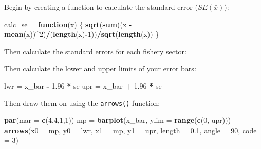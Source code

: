 \documentclass[]{book}
\newenvironment{Shaded}{\begin{snugshade}}{\end{snugshade}}
\newcommand{\KeywordTok}[1]{\textcolor[rgb]{0.13,0.29,0.53}{\textbf{#1}}}
\newcommand{\DataTypeTok}[1]{\textcolor[rgb]{0.13,0.29,0.53}{#1}}
\newcommand{\DecValTok}[1]{\textcolor[rgb]{0.00,0.00,0.81}{#1}}
\newcommand{\FloatTok}[1]{\textcolor[rgb]{0.00,0.00,0.81}{#1}}
\newcommand{\StringTok}[1]{\textcolor[rgb]{0.31,0.60,0.02}{#1}}
\newcommand{\ControlFlowTok}[1]{\textcolor[rgb]{0.13,0.29,0.53}{\textbf{#1}}}
\newcommand{\OperatorTok}[1]{\textcolor[rgb]{0.81,0.36,0.00}{\textbf{#1}}}
\newcommand{\NormalTok}[1]{#1}
\theoremstyle{definition}
\theoremstyle{definition}
\theoremstyle{definition}
\theoremstyle{remark}
\begin{document}
Begin by creating a function to calculate the standard error
(\(SE(\bar{x})\)):

\begin{Shaded}
\begin{Highlighting}[]
\NormalTok{calc_se =}\StringTok{ }\ControlFlowTok{function}\NormalTok{(x) \{}
  \KeywordTok{sqrt}\NormalTok{(}\KeywordTok{sum}\NormalTok{((x }\OperatorTok{-}\StringTok{ }\KeywordTok{mean}\NormalTok{(x))}\OperatorTok{^}\DecValTok{2}\NormalTok{)}\OperatorTok{/}\NormalTok{(}\KeywordTok{length}\NormalTok{(x)}\OperatorTok{-}\DecValTok{1}\NormalTok{))}\OperatorTok{/}\KeywordTok{sqrt}\NormalTok{(}\KeywordTok{length}\NormalTok{(x))}
\NormalTok{\}}
\end{Highlighting}
\end{Shaded}

Then calculate the standard errors for each fishery sector:

\begin{Shaded}
\end{Shaded}

Then calculate the lower and upper limits of your error bars:

\begin{Shaded}
\begin{Highlighting}[]
\NormalTok{lwr =}\StringTok{ }\NormalTok{x_bar }\OperatorTok{-}\StringTok{ }\FloatTok{1.96} \OperatorTok{*}\StringTok{ }\NormalTok{se}
\NormalTok{upr =}\StringTok{ }\NormalTok{x_bar }\OperatorTok{+}\StringTok{ }\FloatTok{1.96} \OperatorTok{*}\StringTok{ }\NormalTok{se}
\end{Highlighting}
\end{Shaded}

Then draw them on using the \texttt{arrows()} function:

\begin{Shaded}
\begin{Highlighting}[]
\KeywordTok{par}\NormalTok{(}\DataTypeTok{mar =} \KeywordTok{c}\NormalTok{(}\DecValTok{4}\NormalTok{,}\DecValTok{4}\NormalTok{,}\DecValTok{1}\NormalTok{,}\DecValTok{1}\NormalTok{))}
\NormalTok{mp =}\StringTok{ }\KeywordTok{barplot}\NormalTok{(x_bar, }\DataTypeTok{ylim =} \KeywordTok{range}\NormalTok{(}\KeywordTok{c}\NormalTok{(}\DecValTok{0}\NormalTok{, upr)))}
\KeywordTok{arrows}\NormalTok{(}\DataTypeTok{x0 =}\NormalTok{ mp, }\DataTypeTok{y0 =}\NormalTok{ lwr, }\DataTypeTok{x1 =}\NormalTok{ mp, }\DataTypeTok{y1 =}\NormalTok{ upr, }\DataTypeTok{length =} \FloatTok{0.1}\NormalTok{, }\DataTypeTok{angle =} \DecValTok{90}\NormalTok{, }\DataTypeTok{code =} \DecValTok{3}\NormalTok{)}
\end{Highlighting}
\end{Shaded}
\end{document}

